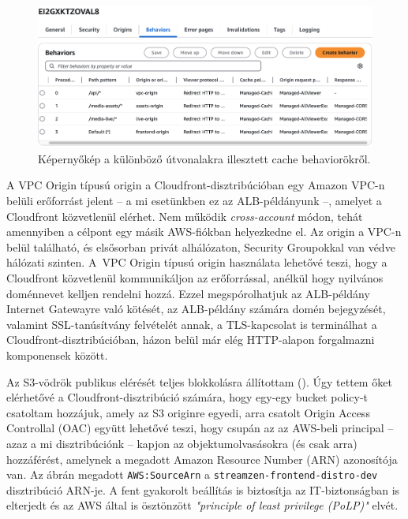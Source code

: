 \begin{figure}[ht]
  \centering
  \includegraphics[width=150mm, keepaspectratio]{figures/distro_behav.png}
  \caption{Képernyőkép a különböző útvonalakra illesztett cache behaviorökről.}
  \label{fig:behav}
\end{figure}

A VPC Origin típusú origin a Cloudfront-disztribúcióban egy Amazon VPC-n belüli erőforrást jelent -- a mi esetünkben ez az ALB-példányunk --, amelyet a Cloudfront közvetlenül elérhet. Nem működik \emph{cross-account} módon, tehát amennyiben a célpont egy másik AWS-fiókban helyezkedne el. Az origin a VPC-n belül található, és elsősorban privát alhálózaton, Security Groupokkal van védve hálózati szinten. A~VPC Origin típusú origin használata lehetővé teszi, hogy a Cloudfront közvetlenül kommunikáljon az erőforrással, anélkül hogy nyilvános doménnevet kelljen rendelni hozzá. Ezzel megspórolhatjuk az ALB-példány Internet Gatewayre való kötését, az ALB-példány számára domén bejegyzését, valamint SSL-tanúsítvány felvételét annak, a TLS-kapcsolat is terminálhat a Cloudfront-disztribúcióban, házon belül már elég HTTP-alapon forgalmazni komponensek között.

Az S3-vödrök publikus elérését teljes blokkolásra állítottam (). Úgy tettem őket elérhetővé a Cloudfront-disztribúció számára, hogy egy-egy bucket policy-t csatoltam hozzájuk, amely az S3 originre egyedi, arra csatolt Origin Access Controllal (OAC)\cite{oac} együtt lehetővé teszi, hogy csupán az az AWS-beli principal -- azaz a mi disztribúciónk -- kapjon az objektumolvasásokra (és csak arra) hozzáférést, amelynek a megadott Amazon Resource Number (ARN) azonosítója van. Az ábrán megadott \verb|AWS:SourceArn| a \verb|streamzen-frontend-distro-dev| disztribúció ARN-je. A fent gyakorolt beállítás is biztosítja az IT-biztonságban is elterjedt és az AWS által is ösztönzött \emph{"principle of least privilege (PoLP)"} elvét.

